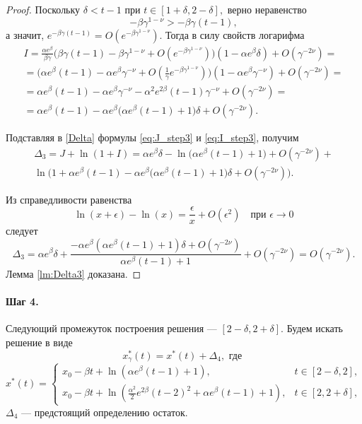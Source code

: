 \begin{proof}
Поскольку $\delta < t - 1$ при $t \in [1 + \delta, 2 - \delta],$ верно неравенство
%
\[-\beta \gamma^{1 - \nu} > - \beta \gamma (t - 1),\]
%
а значит, $e^{-\beta \gamma (t - 1)} = O(e^{-\beta\gamma^{1 - \nu}})$.
Тогда в силу свойств логарифма
%
\begin{multline}
	\label{eq:I_step3}
	I=\frac{\alpha e^{\beta}}{\beta\gamma}\big(\beta\gamma(t-1)-\beta\gamma^{1-\nu}+O(e^{-\beta\gamma^{1-\nu}})\big)(1-\alpha e^{\beta}\delta)+O(\gamma^{-2\nu})=\\
	= \big(\alpha e^{\beta}(t-1)-\alpha e^{\beta}\gamma^{-\nu} + O(\frac{1}{\gamma} e^{-\beta\gamma^{1-\nu}})\big)(1-\alpha e^{\beta}\gamma^{-\nu})+O(\gamma^{-2\nu})=\\
	= \alpha e^{\beta}(t-1)-\alpha e^{\beta}\gamma^{-\nu}-\alpha^2 e^{2\beta}(t-1)\gamma^{-\nu}+O(\gamma^{-2\nu})=\\
	= \alpha e^{\beta}(t-1)-\alpha e^{\beta}\big(\alpha e^{\beta}(t-1)+1\big)\delta+O(\gamma^{-2\nu}).
\end{multline}


Подставляя в \eqref{Delta} формулы \eqref{eq:J_step3}  и \eqref{eq:I_step3}, получим
\begin{multline}
	\label{eq:Delta_step3}
	\Delta_3=J+\ln(1+I)=\alpha e^{\beta}\delta-\ln\big(\alpha e^{\beta}(t-1)+1\big)+O(\gamma^{-2\nu})+\\ \ln\Big(1+\alpha e^{\beta}(t-1)-\alpha e^{\beta}\big(\alpha e^{\beta}(t-1)+1\big)\delta+O(\gamma^{-2\nu})\Big).
\end{multline}

Из справедливости равенства
%
\[\ln(x+\epsilon)-\ln(x) = \frac{\epsilon}{x} + O(\epsilon^2) \quad \text{при } \epsilon \to 0\]
%
следует
\[
\Delta_3 = \alpha e^{\beta}\delta + \frac{-\alpha e^{\beta}(\alpha e^{\beta}(t - 1) + 1)\delta + O(\gamma^{-2\nu})}{\alpha e^{\beta}(t-1)+1} + O(\gamma^{-2\nu}) = O(\gamma^{-2\nu}).
\]
Лемма \ref{lm:Delta3} доказана.
\end{proof}

\paragraph{Шаг 4.} Следующий промежуток построения решения --- $[2 - \delta, 2 + \delta]$. Будем искать решение в виде
\begin{equation}
	\label{eq:sol_4}
	x_\gamma^*(t) = x^*(t) + \Delta_4, \text{ где } 
\end{equation}
\small
\begin{equation}
\label{eq:x_star_4_step}
x^*(t) = 
\begin{cases}
x_0 - \beta t + \ln(\alpha e^{\beta}(t - 1) + 1), & t \in [2 - \delta, 2],\\
x_0 -\beta t + \ln(\frac{\alpha^2}{2} e^{2\beta}(t - 2)^2 + \alpha e^{\beta}(t - 1) + 1), & t \in [2,2 + \delta],
\end{cases}
\end{equation}
\normalsize
$\Delta_4$ --- предстоящий определению остаток.

